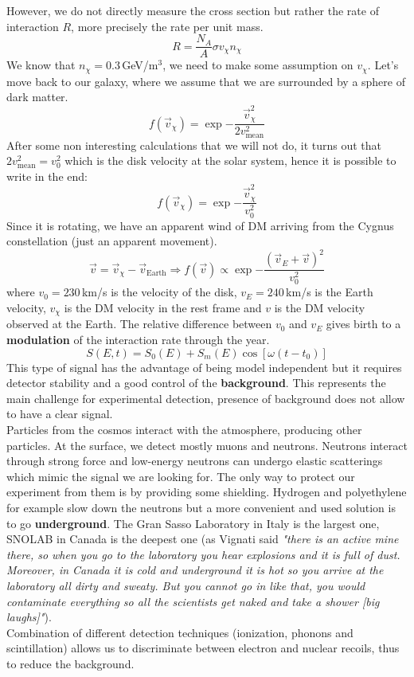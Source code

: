\documentclass[10.75pt,a4paper,openright,bottom=2cm]{article}
\begin{document}
However, we do not directly measure the cross section but rather the rate of interaction $R$, more precisely the rate per unit mass.
\[
R=\frac{N_A}{A}\sigma v_\chi n_\chi
\]
We know that $n_\chi=0.3$\,GeV/m$^3$, we need to make some assumption on $v_\chi$. Let's move back to our galaxy, where we assume that we are surrounded by a sphere of dark matter.
\[
f(\Vec{v}_\chi)=\exp{-\frac{\Vec{v}_\chi^2}{2v_{\text{mean}}^2}}
\]
After some non interesting calculations that we will not do, it turns out that $2v_{\text{mean}}^2=v_0^2$ which is the disk velocity at the solar system, hence it is possible to write in the end:
\[
f(\Vec{v}_\chi)=\exp{-\frac{\Vec{v}_\chi^2}{v_0^2}}
\]
Since it is rotating, we have an apparent wind of DM arriving from the Cygnus constellation (just an apparent movement).
\[
\Vec{v}=\Vec{v}_\chi-\Vec{v}_{\text{Earth}}\Rightarrow f(\Vec{v})\propto\exp{-\frac{(\Vec{v}_E+\Vec{v})^2}{v_0^2}}
\]
where $v_0=230$\,km/s is the velocity of the disk, $v_E=240$\,km/s is the Earth velocity, $v_\chi$ is the DM velocity in the rest frame and $v$ is the DM velocity observed at the Earth. The relative difference between $v_0$ and $v_E$ gives birth to a \textbf{modulation} of the interaction rate through the year.
\[
S(E,t)=S_0(E)+S_m(E)\cos[\omega(t-t_0)]
\]
This type of signal has the advantage of being model independent but it requires detector stability and a good control of the \textbf{background}. This represents the main challenge for experimental detection, presence of background does not allow to have a clear signal.\\
Particles from the cosmos interact with the atmosphere, producing other particles. At the surface, we detect mostly muons and neutrons. Neutrons interact through strong force and low-energy neutrons can undergo elastic scatterings which mimic the signal we are looking for. The only way to protect our experiment from them is by providing some shielding. Hydrogen and polyethylene for example slow down the neutrons but a more convenient and used solution is to go \textbf{underground}. The Gran Sasso Laboratory in Italy is the largest one, SNOLAB in Canada is the deepest one (as Vignati said \textit{"there is an active mine there, so when you go to the laboratory you hear explosions and it is full of dust. Moreover, in Canada it is cold and underground it is hot so you arrive at the laboratory all dirty and sweaty. But you cannot go in like that, you would contaminate everything so all the scientists get naked and take a shower [big laughs]"}).\\
Combination of different detection techniques (ionization, phonons and scintillation) allows us to discriminate between electron and nuclear recoils, thus to reduce the background.\\
\end{document}
